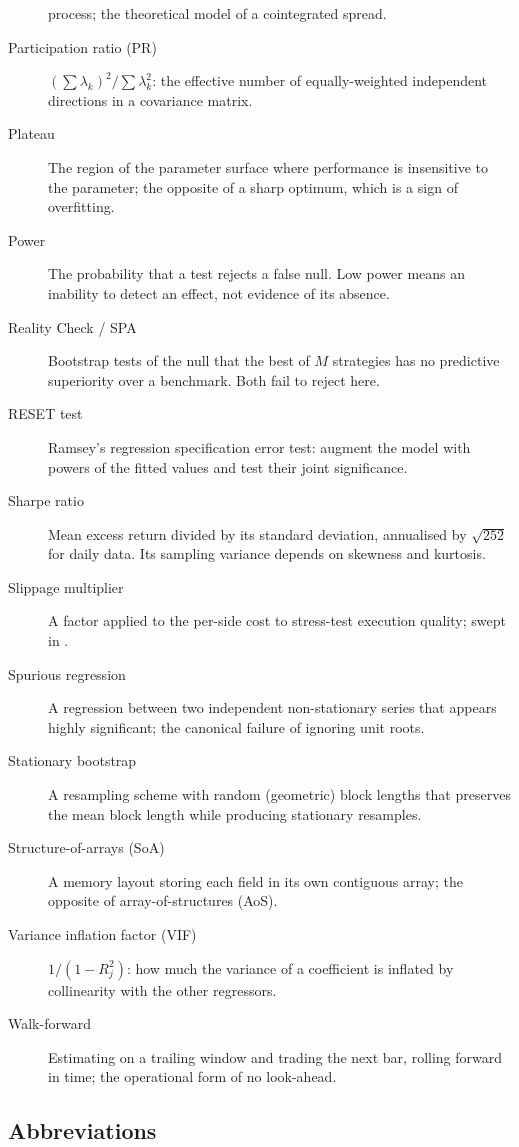 \begin{description}
    process; the theoretical model of a cointegrated spread.
  \item[Participation ratio (PR)] $\left(\sum\lambda_k\right)^2/\sum\lambda_k^2$: the
    effective number of equally-weighted independent directions in a covariance matrix.
  \item[Plateau] The region of the parameter surface where performance is insensitive to
    the parameter; the opposite of a sharp optimum, which is a sign of overfitting.
  \item[Power] The probability that a test rejects a false null. Low power means an
    inability to detect an effect, not evidence of its absence.
  \item[Reality Check / SPA] Bootstrap tests of the null that the best of $M$ strategies
    has no predictive superiority over a benchmark. Both fail to reject here.
  \item[RESET test] Ramsey's regression specification error test: augment the model with
    powers of the fitted values and test their joint significance.
  \item[Sharpe ratio] Mean excess return divided by its standard deviation, annualised by
    $\sqrt{252}$ for daily data. Its sampling variance depends on skewness and kurtosis.
  \item[Slippage multiplier] A factor applied to the per-side cost to stress-test
    execution quality; swept in .
  \item[Spurious regression] A regression between two independent non-stationary series
    that appears highly significant; the canonical failure of ignoring unit roots.
  \item[Stationary bootstrap] A resampling scheme with random (geometric) block lengths
    that preserves the mean block length while producing stationary resamples.
  \item[Structure-of-arrays (SoA)] A memory layout storing each field in its own contiguous
    array; the opposite of array-of-structures (AoS).
  \item[Variance inflation factor (VIF)] $1/(1-R_j^2)$: how much the variance of a
    coefficient is inflated by collinearity with the other regressors.
  \item[Walk-forward] Estimating on a trailing window and trading the next bar, rolling
    forward in time; the operational form of no look-ahead.
\end{description}

\subsection{Abbreviations}

